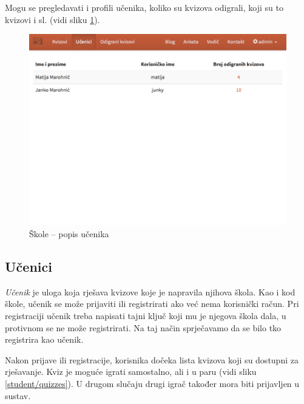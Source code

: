 \documentclass[11pt]{scrreprt}
\begin{document}
Mogu se pregledavati i profili učenika, koliko su kvizova odigrali, koji su to
kvizovi i sl. (vidi sliku \ref{students}).

\begin{figure}[H]
  \includegraphics[width=\textwidth, clip=true, trim=0 15cm 0 0, fbox]{school/students}
  \caption{Škole -- popis učenika}
  \label{students}
\end{figure}

\subsection{Učenici}

\emph{Učenik} je uloga koja rješava kvizove koje je napravila njihova škola.
Kao i kod škole, učenik se može prijaviti ili registrirati ako već nema
korisnički račun. Pri registraciji učenik treba napisati tajni ključ koji mu je
njegova škola dala, u protivnom se ne može registrirati. Na taj način
sprječavamo da se bilo tko registrira kao učenik.

Nakon prijave ili registracije, korisnika dočeka lista kvizova koji su dostupni
za rješavanje. Kviz je moguće igrati samostalno, ali i u paru (vidi sliku
\ref{student/quizzes}). U drugom slučaju drugi igrač također mora biti
prijavljen u sustav.
\end{document}
